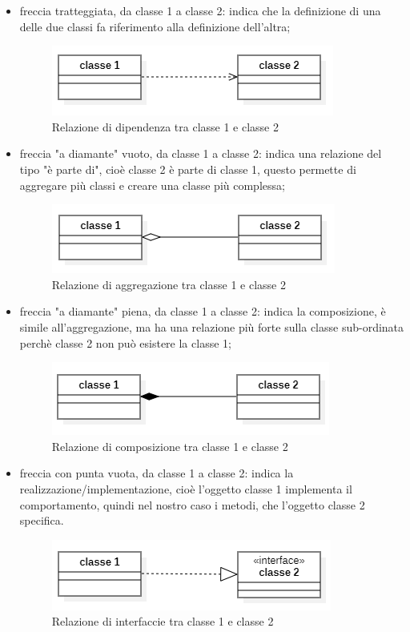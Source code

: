 \begin{itemize}
	\item freccia tratteggiata, da classe 1 a classe 2: indica che la definizione di una delle due classi fa riferimento alla definizione dell'altra;
	\begin{figure}[H]
		\centering\includegraphics{../immagini/normeUML/frecTrat.png}
		\caption{Relazione di dipendenza tra classe 1 e classe 2}
	\end{figure}
	\item freccia "a diamante" vuoto, da classe 1 a classe 2: indica una relazione del tipo "è parte di", cioè classe 2 è parte di classe 1, questo permette di aggregare più classi e creare una classe più complessa;
	\begin{figure}[H]
		\centering\includegraphics{../immagini/normeUML/frecDiamVuot.png}
		\caption{Relazione di aggregazione tra classe 1 e classe 2}
	\end{figure}
	\item freccia "a diamante" piena, da classe 1 a classe 2: indica la composizione, è simile all'aggregazione, ma ha una relazione più forte sulla classe sub-ordinata perchè classe 2 non può esistere la classe 1;
	\begin{figure}[H]
		\centering\includegraphics{../immagini/normeUML/frecDiamPien.png}
		\caption{Relazione di composizione tra classe 1 e classe 2}
	\end{figure}
	\item freccia con punta vuota, da classe 1 a classe 2: indica la realizzazione/implementazione, cioè l'oggetto classe 1 implementa il comportamento, quindi nel nostro caso i metodi, che l'oggetto classe 2 specifica. 
	\begin{figure}[H]
		\centering\includegraphics{../immagini/normeUML/frecInter.png}
		\caption{Relazione di interfaccie tra classe 1 e classe 2}
	\end{figure}
\end{itemize}
